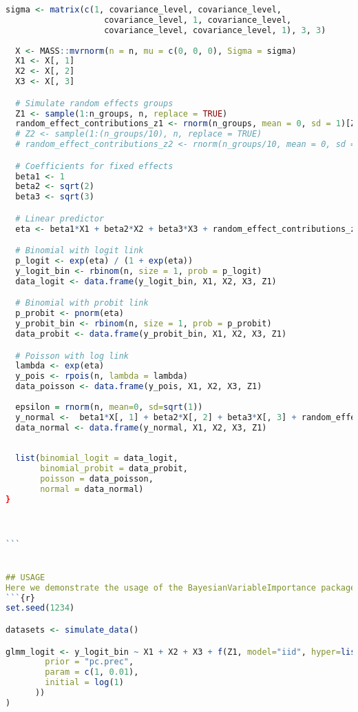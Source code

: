 \begin{lstlisting}[language=R, caption=Usage of the BayesianImpGLMM package with plots and examples.]
  sigma <- matrix(c(1, covariance_level, covariance_level, 
                    covariance_level, 1, covariance_level, 
                    covariance_level, covariance_level, 1), 3, 3)
  
  X <- MASS::mvrnorm(n = n, mu = c(0, 0, 0), Sigma = sigma)
  X1 <- X[, 1]
  X2 <- X[, 2]
  X3 <- X[, 3]

  # Simulate random effects groups
  Z1 <- sample(1:n_groups, n, replace = TRUE)
  random_effect_contributions_z1 <- rnorm(n_groups, mean = 0, sd = 1)[Z1]
  # Z2 <- sample(1:(n_groups/10), n, replace = TRUE)
  # random_effect_contributions_z2 <- rnorm(n_groups/10, mean = 0, sd = 1)[Z2]

  # Coefficients for fixed effects
  beta1 <- 1
  beta2 <- sqrt(2)
  beta3 <- sqrt(3)

  # Linear predictor
  eta <- beta1*X1 + beta2*X2 + beta3*X3 + random_effect_contributions_z1 #+ random_effect_contributions_z2 

  # Binomial with logit link
  p_logit <- exp(eta) / (1 + exp(eta))
  y_logit_bin <- rbinom(n, size = 1, prob = p_logit)
  data_logit <- data.frame(y_logit_bin, X1, X2, X3, Z1)

  # Binomial with probit link
  p_probit <- pnorm(eta)
  y_probit_bin <- rbinom(n, size = 1, prob = p_probit)
  data_probit <- data.frame(y_probit_bin, X1, X2, X3, Z1)

  # Poisson with log link
  lambda <- exp(eta)
  y_pois <- rpois(n, lambda = lambda)
  data_poisson <- data.frame(y_pois, X1, X2, X3, Z1)
  
  epsilon = rnorm(n, mean=0, sd=sqrt(1))
  y_normal <-  beta1*X[, 1] + beta2*X[, 2] + beta3*X[, 3] + random_effect_contributions_z1 + epsilon 
  data_normal <- data.frame(y_normal, X1, X2, X3, Z1)
  
  
  list(binomial_logit = data_logit, 
       binomial_probit = data_probit, 
       poisson = data_poisson, 
       normal = data_normal)
}



```


## USAGE
Here we demonstrate the usage of the BayesianVariableImportance package. We fit Bayesian binomial, Poisson and Gaussian models and sample posterior distributions for different simulated datasets using functions from the package. Then, plots are made to display the results.
```{r}
set.seed(1234)

datasets <- simulate_data()

glmm_logit <- y_logit_bin ~ X1 + X2 + X3 + f(Z1, model="iid", hyper=list(prec = list(
        prior = "pc.prec",
        param = c(1, 0.01),
        initial = log(1)
      ))
)


\end{lstlisting}
